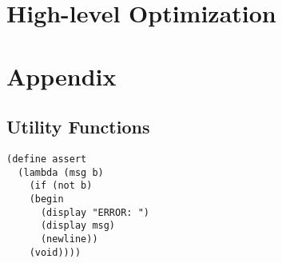 \documentclass[12pt]{book}
\begin{document}
\chapter{High-level Optimization}
\label{ch:high-level-optimization}

\chapter{Appendix}

\section{Utility Functions}
\label{sec:utilities}

\begin{lstlisting}
(define assert
  (lambda (msg b)
    (if (not b)
	(begin
	  (display "ERROR: ")
	  (display msg)
	  (newline))
	(void))))
\end{lstlisting}



\end{document}
